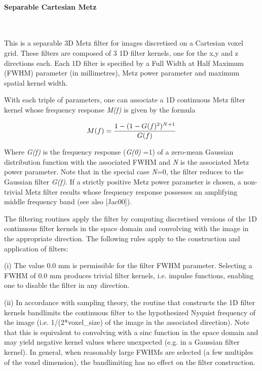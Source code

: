 \documentclass{article}
\newcommand{\subsubsubsection}[1]{\paragraph{#1}\mbox{} \\}
\begin{document}
{{{{ \subsubsubsection{Separable Cartesian Metz}
}
This is a separable 3D Metz filter for images discretised on 
a Cartesian voxel grid. These filters are composed of 3 1D filter 
kernels, one for the x,y and z directions each. Each 1D filter 
is specified by a Full Width at Half Maximum (FWHM) parameter 
(in millimetres), Metz power parameter and maximum spatial kernel 
width. 



With each triple of parameters, one can associate a 1D continuous 
Metz filter kernel whose frequency response \textit{M(f)} is given 
by the formula

\[
M(f)=
{1-(1-G(f)^2)^{N+1}
\over
G(f)
}
\]

Where \textit{G(f)} is the frequency response (\textit{G(0)} =1) of a zero-mean 
Gaussian distribution function with the associated FWHM and \textit{N} 
is the associated Metz power parameter. Note that in the special 
case \textit{N}=0, the filter reduces to the Gaussian filter \textit{G(f)}. 
If a strictly positive Metz power parameter is chosen, a non-trivial 
Metz filter results whose frequency response possesses an amplifying 
middle frequency band (see also [Jac00]).



The filtering routines apply the filter by computing discretised 
versions of the 1D continuous filter kernels in the space domain 
and convolving with the image in the appropriate direction. The 
following rules apply to the construction and application of 
filters:



(i) The value 0.0 mm is permissible for the filter FWHM parameter. 
Selecting a FWHM of 0.0 mm produces trivial filter kernels, i.e. 
impulse functions, enabling one to disable the filter in any 
direction. 



(ii) In accordance with sampling theory, the routine that constructs 
the 1D filter kernels bandlimits the continuous filter to the 
hypothesized Nyquist frequency of the image (i.e. 1/(2*voxel\_size) 
of the image in the associated direction). Note that this is 
equivalent to convolving with a sinc function in the space domain 
and may yield negative kernel values where unexpected (e.g. in 
a Gaussian filter kernel). In general, when reasonably large 
FWHMs are selected (a few multiples of the voxel dimension), 
the bandlimiting has no effect on the filter construction.



}}}
\end{document}
